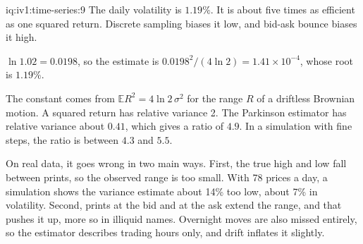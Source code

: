 \begin{solution}{iq:iv1:time-series:9}
The daily volatility is $1.19\%$. It is about five times as efficient as one squared return. Discrete sampling biases it low, and bid-ask bounce biases it high.

$\ln 1.02 = 0.0198$, so the estimate is $0.0198^2/(4\ln 2) = 1.41 \times 10^{-4}$, whose root is $1.19\%$.

The constant comes from $\mathbb{E}R^2 = 4\ln 2\,\sigma^2$ for the range $R$ of a driftless Brownian motion. A squared return has relative variance 2. The Parkinson estimator has relative variance about $0.41$, which gives a ratio of $4.9$. In a simulation with fine steps, the ratio is between $4.3$ and $5.5$.

On real data, it goes wrong in two main ways. First, the true high and low fall between prints, so the observed range is too small. With 78 prices a day, a simulation shows the variance estimate about 14\% too low, about 7\% in volatility. Second, prints at the bid and at the ask extend the range, and that pushes it up, more so in illiquid names. Overnight moves are also missed entirely, so the estimator describes trading hours only, and drift inflates it slightly.



\end{solution}

